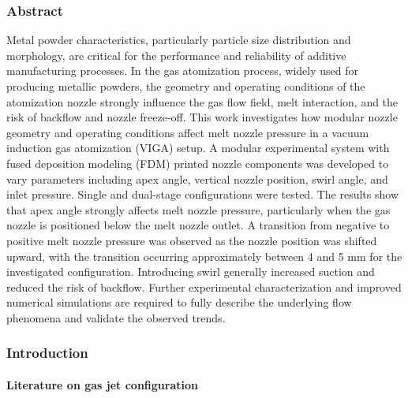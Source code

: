 \documentclass[../../main.tex]{subfiles}
\begin{document}
\subsubsection{Abstract}

Metal powder characteristics, particularly particle size distribution and morphology, are critical for the performance and reliability of additive manufacturing processes. In the gas atomization process, widely used for producing metallic powders, the geometry and operating conditions of the atomization nozzle strongly influence the gas flow field, melt interaction, and the risk of backflow and nozzle freeze-off. This work investigates how modular nozzle geometry and operating conditions affect melt nozzle pressure in a vacuum induction gas atomization (VIGA) setup. A modular experimental system with fused deposition modeling (FDM) printed nozzle components was developed to vary parameters including apex angle, vertical nozzle position, swirl angle, and inlet pressure. Single and dual-stage configurations were tested. The results show that apex angle strongly affects melt nozzle pressure, particularly when the gas nozzle is positioned below the melt nozzle outlet. A transition from negative to positive melt nozzle pressure was observed as the nozzle position was shifted upward, with the transition occurring approximately between 4 and 5 mm for the investigated configuration. Introducing swirl generally increased suction and reduced the risk of backflow. Further experimental characterization and improved numerical simulations are required to fully describe the underlying flow phenomena and validate the observed trends.

\subsubsection{Introduction}

\paragraph{Literature on gas jet configuration}
\end{document}

